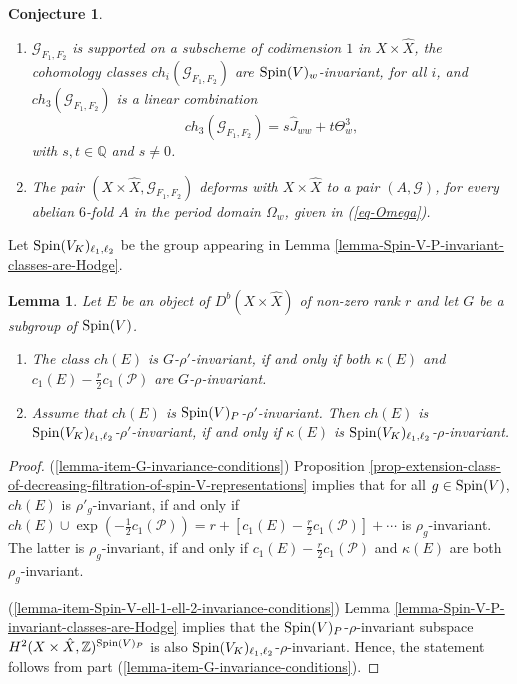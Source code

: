 \documentclass[12pt]{amsart}
\numberwithin{equation}{subsection}
\theoremstyle{plain}
\newtheorem{conj}[thm]{Conjecture}
\newtheorem{lem}[thm]{Lemma}
\theoremstyle{definition}
\newcommand{\G}{{\mathcal G}}
\newcommand{\QQ}{{\mathbb Q}}
\newcommand{\ZZ}{{\mathbb Z}}
\renewcommand{\P}{{\mathcal P}}
\newcommand{\Spin}{{\rm Spin}}
\begin{document}
{\begin{conj}
\begin{enumerate}
\item
$\G_{F_1,F_2}$ is supported on a subscheme of codimension $1$ in $X\times \hat{X}$, the cohomology classes
$ch_i\left(\G_{F_1,F_2}\right)$ are $\Spin(V)_w$-invariant, for all $i$, 
and
$ch_3\left(\G_{F_1,F_2}\right)$ is a linear combination 
\begin{equation}
\label{eq-ch-3}
ch_3\left(\G_{F_1,F_2}\right)=s\hat{J}_{ww}+t\Theta_w^3, 
\end{equation}
with $s,t\in\QQ$ and $s\neq 0$.
\item
The pair $(X\times\hat{X},\G_{F_1,F_2})$ deforms with $X\times\hat{X}$
to a pair $(A,\G)$, for every abelian $6$-fold $A$ in the period domain $\Omega_w$, given in
(\ref{eq-Omega}).
\end{enumerate}
\end{conj}
}

Let $\Spin(V_K)_{\ell_1,\ell_2}$ be the group appearing in Lemma \ref{lemma-Spin-V-P-invariant-classes-are-Hodge}.

\begin{lem}
\label{lemma-Spin-V-ell-1-ell-2-invariance-conditions}
Let $E$ be an object of $D^b(X\times \hat{X})$ of non-zero rank $r$ and let $G$ be a subgroup of $\Spin(V)$. 
\begin{enumerate}
\item
\label{lemma-item-G-invariance-conditions}
The class $ch(E)$ is $G$-$\rho'$-invariant, if and only if both $\kappa(E)$ and $c_1(E)-\frac{r}{2}c_1(\P)$ are $G$-$\rho$-invariant.  
\item
\label{lemma-item-Spin-V-ell-1-ell-2-invariance-conditions} 
Assume that $ch(E)$ is $\Spin(V)_P$-$\rho'$-invariant. Then $ch(E)$ is $\Spin(V_K)_{\ell_1,\ell_2}$-$\rho'$-invariant, if and only if $\kappa(E)$ is 
$\Spin(V_K)_{\ell_1,\ell_2}$-$\rho$-invariant.
\end{enumerate}
\end{lem}

\begin{proof}
(\ref{lemma-item-G-invariance-conditions}) Proposition \ref{prop-extension-class-of-decreasing-filtration-of-spin-V-representations} implies 
that for all $g\in \Spin(V)$, $ch(E)$ is $\rho'_g$-invariant, if and only if $ch(E)\cup\exp(-\frac{1}{2}c_1(\P))=r+[c_1(E)-\frac{r}{2}c_1(\P)]+\cdots$ is $\rho_g$-invariant. The latter is $\rho_g$-invariant, if and only if 
$c_1(E)-\frac{r}{2}c_1(\P)$ and $\kappa(E)$ are both $\rho_g$-invariant.

(\ref{lemma-item-Spin-V-ell-1-ell-2-invariance-conditions}) 
Lemma \ref{lemma-Spin-V-P-invariant-classes-are-Hodge} implies that the $\Spin(V)_P$-$\rho$-invariant  subspace $H^2(X\times\hat{X},\ZZ)^{\Spin(V)_P}$
is also $\Spin(V_K)_{\ell_1,\ell_2}$-$\rho$-invariant. Hence, the statement follows from part (\ref{lemma-item-G-invariance-conditions}).
\end{proof}
\end{document}
